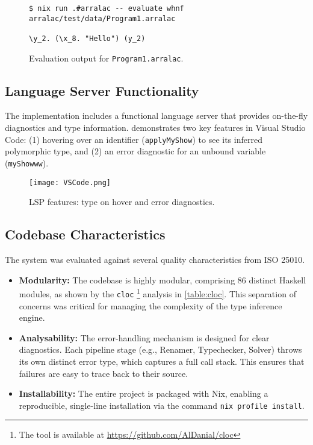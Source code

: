 \begin{figure}
    \centering
    \begin{verbatim}
$ nix run .#arralac -- evaluate whnf arralac/test/data/Program1.arralac

\y_2. (\x_8. "Hello") (y_2)
\end{verbatim}
    \caption{Evaluation output for \texttt{Program1.arralac}.}
    \label{fig:evaluate-output}
\end{figure}

\subsection{Language Server Functionality}
The implementation includes a functional language server that provides on-the-fly diagnostics and type information.  demonstrates two key features in Visual Studio Code: (1) hovering over an identifier (\texttt{applyMyShow}) to see its inferred polymorphic type, and (2) an error diagnostic for an unbound variable (\texttt{myShowww}).

\begin{figure}[h!]
    \centering
    \texttt{[image: VSCode.png]}
    \caption{LSP features: type on hover and error diagnostics.}
    \label{fig:lsp-demo}
\end{figure}

\subsection{Codebase Characteristics}
The system was evaluated against several quality characteristics from ISO 25010.
\begin{itemize}
    \item \textbf{Modularity:} The codebase is highly modular, comprising 86 distinct Haskell modules, as shown by the \texttt{cloc} \footnote{The tool is available at \url{https://github.com/AlDanial/cloc}} analysis in \cref{table:cloc}. This separation of concerns was critical for managing the complexity of the type inference engine.
    \item \textbf{Analysability:} The error-handling mechanism is designed for clear diagnostics. Each pipeline stage (e.g., Renamer, Typechecker, Solver) throws its own distinct error type, which captures a full call stack. This ensures that failures are easy to trace back to their source.
    \item \textbf{Installability:} The entire project is packaged with Nix, enabling a reproducible, single-line installation via the command \texttt{nix profile install}.
\end{itemize}

